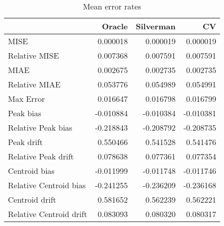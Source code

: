 \begin{table}[ht]
\centering
\begin{tabular}{lrrr}
  \hline
 & Oracle & Silverman & CV \\ 
  \hline
MISE & 0.000018 & 0.000019 & 0.000019 \\ 
  Relative MISE & 0.007368 & 0.007591 & 0.007591 \\ 
  MIAE & 0.002675 & 0.002735 & 0.002735 \\ 
  Relative MIAE & 0.053776 & 0.054989 & 0.054991 \\ 
  Max Error & 0.016647 & 0.016798 & 0.016799 \\ 
  Peak bias & -0.010884 & -0.010384 & -0.010381 \\ 
  Relative Peak bias & -0.218843 & -0.208792 & -0.208735 \\ 
  Peak drift & 0.550466 & 0.541528 & 0.541476 \\ 
  Relative Peak drift & 0.078638 & 0.077361 & 0.077354 \\ 
  Centroid bias & -0.011999 & -0.011748 & -0.011746 \\ 
  Relative Centroid bias & -0.241255 & -0.236209 & -0.236168 \\ 
  Centroid drift & 0.581652 & 0.562239 & 0.562221 \\ 
  Relative Centroid drift & 0.083093 & 0.080320 & 0.080317 \\ 
   \hline
\end{tabular}
\caption{Mean error rates} 
\label{tbl:mean_error_rates}
\end{table}
